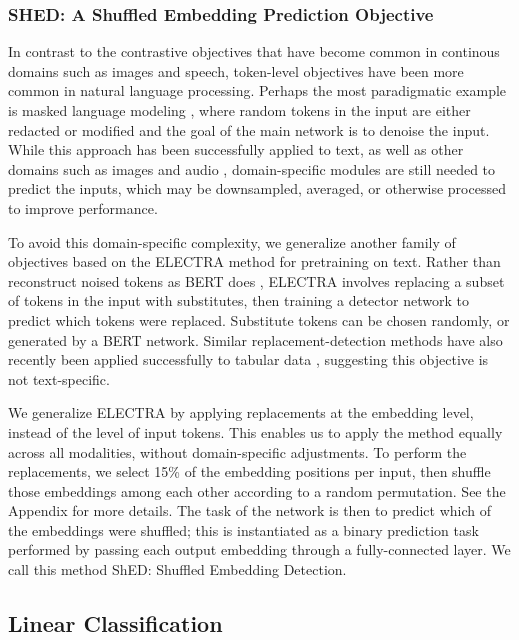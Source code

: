\documentclass{article}
\begin{document}
\subsubsection{SHED: A Shuffled Embedding Prediction Objective}

In contrast to the contrastive objectives that have become common in continous domains such as images and speech, token-level objectives have been more common in natural language processing. Perhaps the most paradigmatic example is masked language modeling \citep{Devlin2019BERTPO}, where random tokens in the input are either redacted or modified and the goal of the main network is to denoise the input. While this approach has been successfully applied to text, as well as other domains such as images \citep{Dosovitskiy2020AnII} and audio \citep{Liu2020MockingjayUS}, domain-specific modules are still needed to predict the inputs, which may be downsampled, averaged, or otherwise processed to improve performance.

To avoid this domain-specific complexity, we generalize another family of objectives based on the ELECTRA \citep{Clark2020ELECTRAPT} method for pretraining on text. Rather than reconstruct noised tokens as BERT does \citep{Devlin2019BERTPO}, ELECTRA involves replacing a subset of tokens in the input with substitutes, then training a detector network to predict which tokens were replaced. Substitute tokens can be chosen randomly, or generated by a BERT network. Similar replacement-detection methods have also recently been applied successfully to tabular data \citep{Iida2021TABBIEPR}, suggesting this objective is not text-specific.

We generalize ELECTRA by applying replacements at the embedding level, instead of the level of input tokens. This enables us to apply the method equally across all modalities, without domain-specific adjustments. To perform the replacements, we select 15\% of the embedding positions per input, then shuffle those embeddings among each other according to a random permutation. See the Appendix for more details. The task of the network is then to predict which of the embeddings were shuffled; this is instantiated as a binary prediction task performed by passing each output embedding through a fully-connected layer. We call this method ShED: Shuffled Embedding Detection.

\subsection{Linear Classification}
\end{document}
